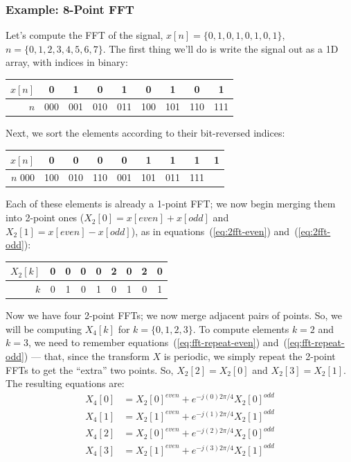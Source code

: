\subsubsection{Example: 8-Point FFT}

Let's compute the FFT of the signal, $x[n] = \{0, 1, 0, 1, 0, 1, 0,
1\}$, $n = \{0, 1, 2, 3, 4, 5, 6, 7\}$. The first thing we'll do is
write the signal out as a 1D array, with indices in binary:
\begin{center}
  \begin{tabular}{r|c|c|c|c|c|c|c|c|} \hline
    $x[n]$ & 0   & 1   & 0   & 1   & 0   & 1   & 0   & 1   \\ \hline
    $n$ & 000 & 001 & 010 & 011 & 100 & 101 & 110 & 111 \\ \hline
  \end{tabular}
\end{center}

Next, we sort the elements according to their bit-reversed indices:
\begin{center}
  \begin{tabular}{r|c|c|c|c|c|c|c|c|} \hline
    $x[n]$ & 0   & 0   & 0   & 0   & 1   & 1   & 1   & 1   \\ \hline
    $n$ 000 & 100 & 010 & 110 & 001 & 101 & 011 & 111 \\ \hline
  \end{tabular}
\end{center}

Each of these elements is already a 1-point FFT; we now begin merging
them into 2-point ones ($X_2[0]= x[\mathit{even}] + x[\mathit{odd}]$
and $X_2[1]= x[\mathit{even}] - x[\mathit{odd}]$), as in
equations~(\ref{eq:2fft-even}) and~(\ref{eq:2fft-odd}):
\begin{center}
  \begin{tabular}{r|c|c||c|c||c|c||c|c|} \hline
    $X_2[k]$ & 0   & 0   & 0   & 0   & 2   & 0   & 2   & 0   \\ \hline
    $k$        & 0   & 1   & 0   & 1   & 0   & 1   & 0   & 1   \\ \hline
  \end{tabular}
\end{center}

Now we have four 2-point FFTs; we now merge adjacent pairs of
points. So, we will be computing $X_4[k]$ for $k=\{0, 1, 2, 3\}$. To
compute elements $k=2$ and $k=3$, we need to remember
equations~(\ref{eq:fft-repeat-even}) and~(\ref{eq:fft-repeat-odd}) ---
that, since the transform $X$ is periodic, we simply repeat the
2-point FFTs to get the ``extra'' two points. So, $X_2[2] = X_2[0]$
and $X_2[3] = X_2[1]$. The resulting equations are:
\begin{align*}
  X_4[0] &= X_2[0]^{\mathit{even}} +   e^{-j(0)2\pi/4}X_2[0]^{\mathit{odd}} \\
  X_4[1] &= X_2[1]^{\mathit{even}} +   e^{-j(1)2\pi/4}X_2[1]^{\mathit{odd}} \\
  X_4[2] &= X_2[0]^{\mathit{even}} +   e^{-j(2)2\pi/4}X_2[0]^{\mathit{odd}} \\
  X_4[3] &= X_2[1]^{\mathit{even}} +   e^{-j(3)2\pi/4}X_2[1]^{\mathit{odd}}
\end{align*}


